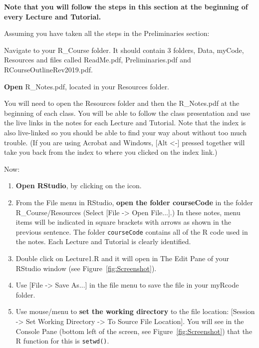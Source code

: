 \documentclass[titlepage]{book}
\begin{document}
\textbf{Note that you will follow the steps in this section at the beginning of every Lecture and Tutorial.}

Assuming you have taken all the steps in the Preliminaries section:

Navigate to your R\_Course folder. It should contain 3 folders, Data, myCode, Resources and files called ReadMe.pdf, Preliminaries.pdf and RCourseOutlineRev2019.pdf. 

\textbf{Open} R\_Notes.pdf, located in your Resources folder.

You will need to open the Resources folder and then the R\_Notes.pdf at the beginning of each class. You will be able to follow the class presentation and use the live links in the notes for each Lecture and Tutorial. Note that the index is also live-linked so you should be able to find your way about without too much trouble. (If you are using Acrobat and Windows, [Alt <-] pressed together will take you back from the index to where you clicked on the index link.)

Now: 

\begin{enumerate}

\item {\textbf{Open RStudio}, by clicking on the icon.}

\item{From the File menu in RStudio, \textbf{open the folder courseCode} in the folder R\_Course/Resources  (Select [File -> Open File...].) In these notes, menu items will be indicated in square brackets with arrows as shown in the previous sentence.  The folder \texttt{courseCode} contains all of the R code used in the notes.  Each Lecture and Tutorial is clearly identified.} 

\item{Double click on Lecture1.R and it will open in The Edit Pane  of your RStudio window (see Figure~\ref{fig:Screenshot}).}

\item{Use [File -> Save As...] in the file menu to save the file in your myRcode folder.}  

\item{Use mouse/menu to \textbf{set the working directory} to the file location: [Session -> Set Working Directory -> To Source File Location]. You will see in the Console Pane (bottom left of the screen, see Figure~\ref{fig:Screenshot}) that the R function for this is \texttt{setwd()}.}

\end{enumerate}
\end{document}
